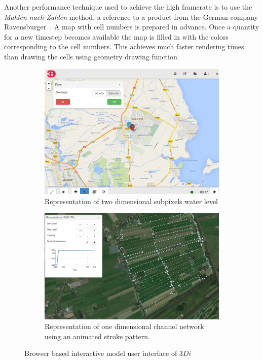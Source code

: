 \documentclass[a4paper]{article}
\DeclareRobustCommand{\threedi}{$3Di$~}
\begin{document}
Another performance technique used to achieve the high framerate is to use the \emph{Mahlen nach Zahlen} method, a reference to a product from the German company Ravensburger~\textregistered. A map with cell numbers is prepared in advance. Once a quantity for a new timestep becomes available the map is filled in with the colors corresponding to the cell numbers. This achieves much faster rendering times than drawing the cells using geometry drawing function.

\begin{figure}[htbp]
  \centering

  \begin{subfigure}{0.4\textwidth}
    \includegraphics[width=1\textwidth]{webgui}
    \caption{Representation of two dimensional subpixels water level}
    \label{fig:twod}
  \end{subfigure}
  \begin{subfigure}{0.4\textwidth}
    \includegraphics[width=1\textwidth]{oned}
    \caption{Representation of one dimensional channel network using an animated stroke pattern.}
    \label{fig:oned}
  \end{subfigure}
  \label{fig:gui}
  \caption{Browser based interactive model user interface of \threedi}
\end{figure}
\end{document}
